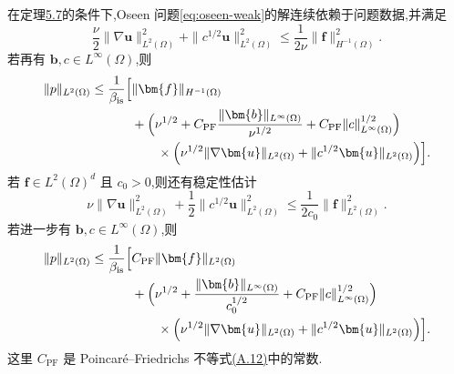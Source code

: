 \begin{lemma}[解的稳定性]\label{lem:oseen-solution-stability}
在定理\hyperref[thm:oseen-weak-existence-uniqueness]{5.7}的条件下,Oseen 问题\cref{eq:oseen-weak}的解连续依赖于问题数据,并满足
\begin{equation}\label{eq:oseen-stability-velocity-hminus1}
  \frac{\nu}{2}\|\nabla\bm{u}\|_{L^2(\Omega)}^2
  +\|c^{1/2}\bm{u}\|_{L^2(\Omega)}^2
  \le\frac{1}{2\nu}\|\bm{f}\|_{H^{-1}(\Omega)}^2.
\end{equation}
若再有 $\bm{b},c\in L^\infty(\Omega)$,则
\begin{equation}\label{eq:oseen-stability-pressure-hminus1}
\begin{aligned}
  \|p\|_{L^2(\Omega)}\le\frac{1}{\beta_{\mathrm{is}}}\Bigl[&
    \|\bm{f}\|_{H^{-1}(\Omega)}\\
    &+\Bigl(\nu^{1/2}
      +C_{\mathrm{PF}}\frac{\|\bm{b}\|_{L^\infty(\Omega)}}{\nu^{1/2}}
      +C_{\mathrm{PF}}\|c\|_{L^\infty(\Omega)}^{1/2}\Bigr)\\
    &\qquad\times\Bigl(
      \nu^{1/2}\|\nabla\bm{u}\|_{L^2(\Omega)}
      +\|c^{1/2}\bm{u}\|_{L^2(\Omega)}\Bigr)\Bigr].
\end{aligned}
\end{equation}
若 $\bm{f}\in L^2(\Omega)^d$ 且 $c_0>0$,则还有稳定性估计
\begin{equation}\label{eq:oseen-stability-velocity-l2}
  \nu\|\nabla\bm{u}\|_{L^2(\Omega)}^2
  +\frac12\|c^{1/2}\bm{u}\|_{L^2(\Omega)}^2
  \le\frac{1}{2c_0}\|\bm{f}\|_{L^2(\Omega)}^2.
\end{equation}
若进一步有 $\bm{b},c\in L^\infty(\Omega)$,则
\begin{equation}\label{eq:oseen-stability-pressure-l2}
\begin{aligned}
  \|p\|_{L^2(\Omega)}\le\frac{1}{\beta_{\mathrm{is}}}\Bigl[&
    C_{\mathrm{PF}}\|\bm{f}\|_{L^2(\Omega)}\\
    &+\Bigl(\nu^{1/2}
      +\frac{\|\bm{b}\|_{L^\infty(\Omega)}}{c_0^{1/2}}
      +C_{\mathrm{PF}}\|c\|_{L^\infty(\Omega)}^{1/2}\Bigr)\\
    &\qquad\times\Bigl(
      \nu^{1/2}\|\nabla\bm{u}\|_{L^2(\Omega)}
      +\|c^{1/2}\bm{u}\|_{L^2(\Omega)}\Bigr)\Bigr].
\end{aligned}
\end{equation}
这里 $C_{\mathrm{PF}}$ 是 Poincaré--Friedrichs 不等式\hyperref[eq:appendix-a-12]{(A.12)}中的常数.
\end{lemma}

